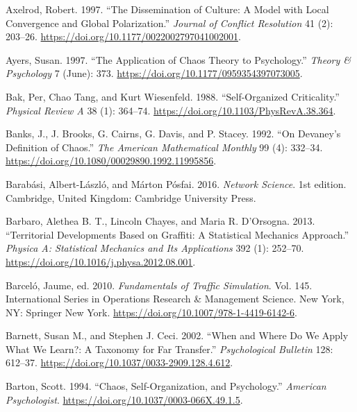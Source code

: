 \documentclass[
  a4paper,
  DIV=11,
  numbers=noendperiod,
  oneside]{scrreprt}
\newlength{\cslhangindent}
\newenvironment{CSLReferences}[2] %
 {\begin{list}{}{%
  \setlength{\itemindent}{0pt}
  \setlength{\leftmargin}{0pt}
  \setlength{\parsep}{0pt}
  \ifodd #1
   \setlength{\leftmargin}{\cslhangindent}
   \setlength{\itemindent}{-1\cslhangindent}
  \fi
  \setlength{\itemsep}{#2\baselineskip}}}
 {\end{list}}
\begin{document}
\begin{CSLReferences}{1}{0}
Axelrod, Robert. 1997. {``The {Dissemination} of {Culture}: {A Model}
with {Local Convergence} and {Global Polarization}.''} \emph{Journal of
Conflict Resolution} 41 (2): 203--26.
\url{https://doi.org/10.1177/0022002797041002001}.

Ayers, Susan. 1997. {``The {Application} of {Chaos Theory} to
{Psychology}.''} \emph{Theory \& Psychology} 7 (June): 373.
\url{https://doi.org/10.1177/0959354397073005}.

Bak, Per, Chao Tang, and Kurt Wiesenfeld. 1988. {``Self-Organized
Criticality.''} \emph{Physical Review A} 38 (1): 364--74.
\url{https://doi.org/10.1103/PhysRevA.38.364}.

Banks, J., J. Brooks, G. Cairns, G. Davis, and P. Stacey. 1992. {``On
{Devaney}'s {Definition} of {Chaos}.''} \emph{The American Mathematical
Monthly} 99 (4): 332--34.
\url{https://doi.org/10.1080/00029890.1992.11995856}.

Barabási, Albert-László, and Márton Pósfai. 2016. \emph{Network
{Science}}. 1st edition. {Cambridge, United Kingdom}: {Cambridge
University Press}.

Barbaro, Alethea B. T., Lincoln Chayes, and Maria R. D'Orsogna. 2013.
{``Territorial Developments Based on Graffiti: {A} Statistical Mechanics
Approach.''} \emph{Physica A: Statistical Mechanics and Its
Applications} 392 (1): 252--70.
\url{https://doi.org/10.1016/j.physa.2012.08.001}.

Barceló, Jaume, ed. 2010. \emph{Fundamentals of {Traffic Simulation}}.
Vol. 145. International {Series} in {Operations Research} \& {Management
Science}. {New York, NY}: {Springer New York}.
\url{https://doi.org/10.1007/978-1-4419-6142-6}.

Barnett, Susan M., and Stephen J. Ceci. 2002. {``When and Where Do We
Apply What We Learn?: {A} Taxonomy for Far Transfer.''}
\emph{Psychological Bulletin} 128: 612--37.
\url{https://doi.org/10.1037/0033-2909.128.4.612}.

Barton, Scott. 1994. {``Chaos, {Self-Organization}, and {Psychology}.''}
\emph{American Psychologist}.
\url{https://doi.org/10.1037/0003-066X.49.1.5}.


\end{CSLReferences}
\end{document}
